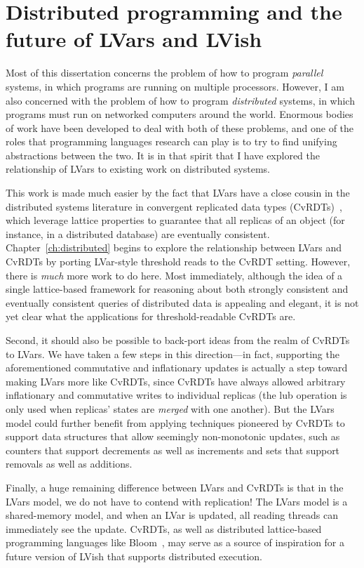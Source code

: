 \ifdefined\DISSERTATION
\section{Distributed programming and the future of LVars and LVish}


Most of this dissertation concerns the problem of how to program
\emph{parallel} systems, in which programs are running on multiple
processors.  However, I am also concerned with the problem of how to
program \emph{distributed} systems, in which programs must run on
networked computers around the world.  Enormous bodies of work have
been developed to deal with both of these problems, and one of the
roles that programming languages research can play is to try to find
unifying abstractions between the two. It is in that spirit that I
have explored the relationship of LVars to existing work on
distributed systems.

This work is made much easier by the fact that LVars have a close
cousin in the distributed systems literature in convergent replicated
data types (CvRDTs)~\cite{crdts,crdts-tr}, which leverage lattice
properties to guarantee that all replicas of an object (for instance,
in a distributed database) are eventually consistent.
Chapter~\ref{ch:distributed} begins to explore the relationship
between LVars and CvRDTs by porting LVar-style threshold reads to the
CvRDT setting.  However, there is \emph{much} more work to do here.
Most immediately, although the idea of a single lattice-based
framework for reasoning about both strongly consistent and eventually
consistent queries of distributed data is appealing and elegant, it is
not yet clear what the applications for threshold-readable CvRDTs are.

Second, it should also be possible to back-port ideas from the realm
of CvRDTs to LVars.  We have taken a few steps in this direction---in
fact, supporting the aforementioned commutative and inflationary
updates is actually a step toward making LVars more like CvRDTs, since
CvRDTs have always allowed arbitrary inflationary and commutative
writes to individual replicas (the lub operation is only used when
replicas' states are \emph{merged} with one another).  But the LVars
model could further benefit from applying techniques pioneered by
CvRDTs to support data structures that allow seemingly non-monotonic
updates, such as counters that support decrements as well as
increments and sets that support removals as well as additions.

Finally, a huge remaining difference between LVars and CvRDTs is that
in the LVars model, we do not have to contend with replication!  The
LVars model is a shared-memory model, and when an LVar is updated, all
reading threads can immediately see the update.  CvRDTs, as well as
distributed lattice-based programming languages like
Bloom~\cite{bloom-cidr, blooml}, may serve as a source of inspiration
for a future version of LVish that supports distributed execution.

\fi
